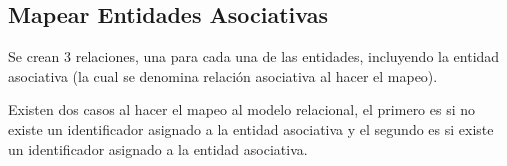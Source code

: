 \documentclass[12pt, fleqn]{report}                             %
\theoremstyle{break}                                            %
\begin{document}
            \clearpage
            \subsection{Mapear Entidades Asociativas}

                Se crean 3 relaciones, una para cada una de las entidades, incluyendo la entidad asociativa
                (la cual se denomina relación asociativa al hacer el mapeo).

                Existen dos casos al hacer el mapeo al modelo relacional, el primero es si no existe un
                identificador asignado a la entidad asociativa y el segundo es si existe un identificador
                asignado a la entidad asociativa.
\end{document}
